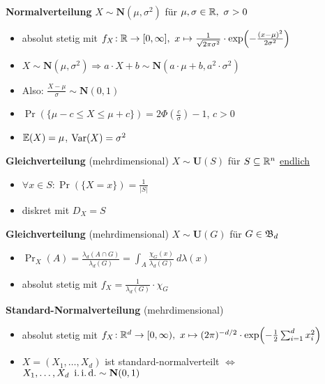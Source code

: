 \textbf{Normalverteilung} $X\sim\mathbf{N}(\mu,\sigma^2)$ für
  $\mu,\sigma\in\mathbb{R},\ \sigma > 0$
\begin{itemize}
\item absolut stetig mit $f_X\!: \R \to [0,\infty],\
  x \mapsto \frac{1}{\sqrt{2\pi\sigma^2}} \cdot \exp\left(-\frac{(x-\mu)^2}{2\sigma^2}\right)$

\item $X\sim\mathbf{N}(\mu,\sigma^2)
  \Rightarrow a \cdot X + b \sim\mathbf{N}(a\cdot\mu+b,a^2\cdot\sigma^2)$

\item Also: $\frac{X-\mu}{\sigma} \sim \mathbf{N}(0,1)$

\item $\Pr(\{\mu-c\leq X\leq \mu+c\}) = 2\Phi(\frac{c}{\sigma})-1$, $c>0$

\item $\mathbb{E}(X) = \mu$, $\operatorname{Var}(X) = \sigma^2$
\end{itemize}

\textbf{Gleichverteilung} (mehrdimensional) $X\sim\mathbf{U}(S)$ für $S\subseteq\mathbb{R}^n$
\underline{endlich}
\begin{itemize}
\item $\forall x\in S\!: \Pr(\{X=x\}) = \frac{1}{|S|}$

\item diskret mit $D_X = S$
\end{itemize}

\textbf{Gleichverteilung} (mehrdimensional) $X\sim\mathbf{U}(G)$ für $G\in\mathfrak{B}_d$
\begin{itemize}
\item $\Pr_X(A) = \frac{\lambda_d(A\cap G)}{\lambda_d(G)} =
  \int_A \frac{\chi_G(x)}{\lambda_d(G)}~d\lambda(x)$

\item absolut stetig mit $f_X = \frac{1}{\lambda_d(G)} \cdot \chi_G$
\end{itemize}

\textbf{Standard-Normalverteilung} (mehrdimensional)
\begin{itemize}
\item absolut stetig mit
  $f_X\!: \R^d \to [0,\infty),\
  x \mapsto (2\pi)^{-d/2} \cdot \exp\left(-\frac{1}{2} \sum_{i=1}^{d}x_i^2\right)$

\item $X = (X_1,\ldots,X_d)$ ist standard-normalverteilt
  $\Leftrightarrow$ $X_1,\ldots,X_d\ \operatorname{i.i.d.} \sim\mathbf{N}(0,1)$
\end{itemize}
